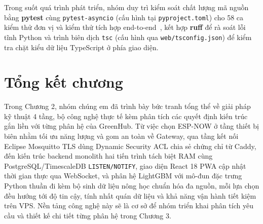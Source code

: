Trong suốt quá trình phát triển, nhóm duy trì kiểm soát chất lượng mã nguồn bằng \textbf{pytest} cùng \texttt{pytest-asyncio} (cấu hình tại \texttt{pyproject.toml}) cho 58 ca kiểm thử đơn vị và kiểm thử tích hợp end-to-end~\cite{pytestDocs}, kết hợp \textbf{ruff} để rà soát lỗi tĩnh Python và trình biên dịch \texttt{tsc} (cấu hình qua \texttt{web/tsconfig.json}) để kiểm tra chặt kiểu dữ liệu TypeScript ở phía giao diện.

\section{Tổng kết chương}
\label{sec:c2-summary}

Trong Chương 2, nhóm chúng em đã trình bày bức tranh tổng thể về giải pháp kỹ thuật 4 tầng, bộ công nghệ thực tế kèm phân tích các quyết định kiến trúc gắn liền với từng phân hệ của GreenHub. Từ việc chọn ESP-NOW ở tầng thiết bị biên nhằm tối ưu năng lượng và gom an toàn về Gateway, qua tầng kết nối Eclipse Mosquitto TLS dùng Dynamic Security ACL chia sẻ chứng chỉ từ Caddy, đến kiến trúc backend monolith hai tiến trình tách biệt RAM cùng PostgreSQL/TimescaleDB \texttt{LISTEN/NOTIFY}, giao diện React 18 PWA cập nhật thời gian thực qua WebSocket, và phân hệ LightGBM với mô-đun đặc trưng Python thuần đi kèm bộ sinh dữ liệu nông học chuẩn hóa đa nguồn, mỗi lựa chọn đều hướng tới độ tin cậy, tính nhất quán dữ liệu và khả năng vận hành tiết kiệm trên VPS. Nền tảng công nghệ này sẽ là cơ sở để nhóm triển khai phân tích yêu cầu và thiết kế chi tiết từng phân hệ trong Chương 3.